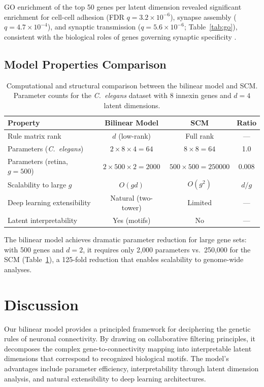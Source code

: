\documentclass[11pt]{article}
\begin{document}
GO enrichment of the top 50 genes per latent dimension revealed significant enrichment for cell-cell adhesion (FDR $q = 3.2 \times 10^{-6}$), synapse assembly ($q = 4.7 \times 10^{-4}$), and synaptic transmission ($q = 5.6 \times 10^{-6}$; Table~\ref{tab:go}), consistent with the biological roles of genes governing synaptic specificity \citep{sanes2020synaptic}.

\subsection{Model Properties Comparison}

\begin{table}[H]
\centering
\caption{Computational and structural comparison between the bilinear model and SCM. Parameter counts for the \textit{C.~elegans} dataset with 8 innexin genes and $d = 4$ latent dimensions.}
\label{tab:comparison}
\begin{tabular}{lccc}
\toprule
Property & Bilinear Model & SCM & Ratio \\
\midrule
Rule matrix rank & $d$ (low-rank) & Full rank & --- \\
Parameters (\textit{C.~elegans}) & $2 \times 8 \times 4 = 64$ & $8 \times 8 = 64$ & 1.0 \\
Parameters (retina, $g = 500$) & $2 \times 500 \times 2 = 2000$ & $500 \times 500 = 250000$ & 0.008 \\
Scalability to large $g$ & $O(gd)$ & $O(g^2)$ & $d/g$ \\
Deep learning extensibility & Natural (two-tower) & Limited & --- \\
Latent interpretability & Yes (motifs) & No & --- \\
\bottomrule
\end{tabular}
\end{table}

The bilinear model achieves dramatic parameter reduction for large gene sets: with 500 genes and $d = 2$, it requires only 2,000 parameters vs.\ 250,000 for the SCM (Table~\ref{tab:comparison}), a 125-fold reduction that enables scalability to genome-wide analyses.

\section{Discussion}

Our bilinear model provides a principled framework for deciphering the genetic rules of neuronal connectivity. By drawing on collaborative filtering principles, it decomposes the complex gene-to-connectivity mapping into interpretable latent dimensions that correspond to recognized biological motifs. The model's advantages include parameter efficiency, interpretability through latent dimension analysis, and natural extensibility to deep learning architectures.
\end{document}
